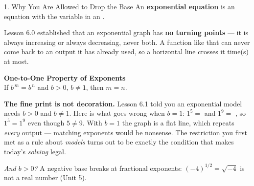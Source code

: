 \documentclass[10pt]{article}
\begin{document}
\begin{notesbox}{1. Why You Are Allowed to Drop the Base}
An \textbf{exponential equation} is an equation with the variable in an \blank{2.6cm}.

\vspace{4pt}
Lesson 6.0 established that an exponential graph has \textbf{no turning points} --- it is always
increasing or always decreasing, never both. A function like that can never come back to an output it
has already used, so a horizontal line crosses it \blank{2.6cm} time(s) at most.

\vspace{4pt}
\begin{center}
\begin{tcolorbox}[colback=goldbg, colframe=goldacc, boxrule=0.8pt, arc=1.5mm, width=0.90\linewidth,
    left=3mm, right=3mm, top=2mm, bottom=2mm]
\centering
\textbf{One-to-One Property of Exponents} \\[3pt]
If \; $b^{\,m} = b^{\,n}$ \; and \; $b>0$, $b\neq1$, \qquad then \; $m=n$.
\end{tcolorbox}
\end{center}

\vspace{2pt}
\textbf{The fine print is not decoration.} Lesson 6.1 told you an exponential model needs $b>0$ and
$b\neq1$. Here is what goes wrong when $b=1$: \; $1^{5}=$ \blank{1.0cm} \; and \; $1^{9}=$
\blank{1.0cm}, \; so $1^{5}=1^{9}$ even though $5\neq9$. With $b=1$ the graph is a flat line, which
repeats \emph{every} output --- matching exponents would be nonsense. The restriction you first met as
a rule about \emph{models} turns out to be exactly the condition that makes today's \emph{solving}
legal.

\vspace{3pt}
\emph{And $b>0$?} A negative base breaks at fractional exponents: $(-4)^{1/2}=\sqrt{-4}$ is not a real
number (Unit 5).
\end{notesbox}
\end{document}
